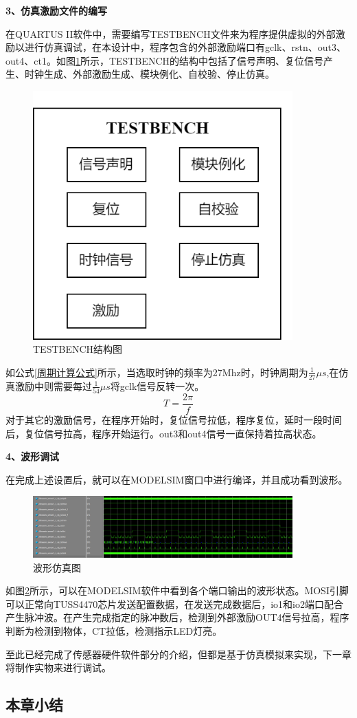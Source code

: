     \noindent
    \textbf{3、仿真激励文件的编写}\par
    在QUARTUS II软件中，需要编写TESTBENCH文件来为程序提供虚拟的外部激励以进行仿真调试，在本设计中，程序包含的外部激励端口有gclk、rstn、out3、out4、ct1。如图\ref{TESTBENCH结构图}所示，TESTBENCH的结构中包括了信号声明、复位信号产生、时钟生成、外部激励生成、模块例化、自校验、停止仿真。\par
    \begin{figure}[ht]
        \centering
        \includegraphics[width=10cm]{figure/TESTBENCH structure.png}
        \caption{TESTBENCH结构图}
        \label{TESTBENCH结构图}
    \end{figure}
    如公式\ref{周期计算公式}所示，当选取时钟的频率为27Mhz时，时钟周期为$\frac{1}{27}\mu s$,在仿真激励中则需要每过$\frac{1}{54}
   \mu s$将gclk信号反转一次。
    \begin{equation}
        T=\frac{2\pi}{f}
        \label{周期计算公式}
    \end{equation}
    对于其它的激励信号，在程序开始时，复位信号拉低，程序复位，延时一段时间后，复位信号拉高，程序开始运行。out3和out4信号一直保持着拉高状态。

    \noindent
    \textbf{4、波形调试}\par
    在完成上述设置后，就可以在MODELSIM窗口中进行编译，并且成功看到波形。
    \begin{figure}[ht]
        \centering
        \includegraphics[width=10cm]{figure/wave simulation.png}
        \caption{波形仿真图}
        \label{波形仿真图}
    \end{figure}
    如图\ref{波形仿真图}所示，可以在MODELSIM软件中看到各个端口输出的波形状态。MOSI引脚可以正常向TUSS4470芯片发送配置数据，在发送完成数据后，io1和io2端口配合产生脉冲波。在产生完成指定的脉冲数后，检测到外部激励OUT4信号拉高，程序判断为检测到物体，CT拉低，检测指示LED灯亮。\par
    至此已经完成了传感器硬件软件部分的介绍，但都是基于仿真模拟来实现，下一章将制作实物来进行调试。
    \subsection{本章小结}
    